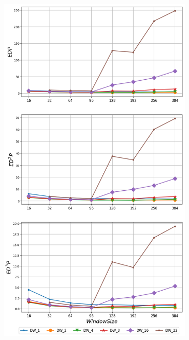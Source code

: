   \begin{minipage}{\textwidth}
      \begin{center}
         \\
         \vspace{3mm}
         \includegraphics[width=0.7\textwidth]{./graphs/edp/cactusADM.png}
         \vspace{6mm}
      \end{center}
   \end{minipage}

